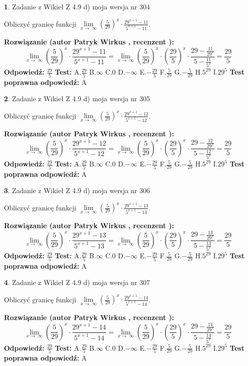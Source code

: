 \documentclass[12pt, a4paper]{article}
\theoremstyle{definition} %
\newtheorem{zad}{}
\newcommand{\zadStart}[1]{\begin{zad}#1\newline}
\newcommand{\zadStop}{\end{zad}}
\newcommand{\rozwStart}[2]{\noindent \textbf{Rozwiązanie (autor #1 , recenzent #2): }\newline}
\newcommand{\rozwStop}{\newline}
\newcommand{\odpStart}{\noindent \textbf{Odpowiedź:}\newline}
\newcommand{\odpStop}{\newline}
\newcommand{\testStart}{\noindent \textbf{Test:}\newline}
\newcommand{\testStop}{\newline}
\newcommand{\kluczStart}{\noindent \textbf{Test poprawna odpowiedź:}\newline}
\newcommand{\kluczStop}{\newline}
\begin{document}
\zadStart{Zadanie z Wikieł Z 4.9 d) moja wersja nr 304}


Obliczyć granicę funkcji  $\lim\limits_{x\to\ \infty}(\frac{5}{29})^{x}\cdot\frac{29^{x+1}-11}{5^{x+1}-11}$.
\zadStop
\rozwStart{Patryk Wirkus}{}
$$\lim\limits_{x\to\ \infty}(\frac{5}{29})^{x}\cdot\frac{29^{x+1}-11}{5^{x+1}-11}=\lim\limits_{x\to\ \infty}(\frac{5}{29})^{x}\cdot(\frac{29}{5})^{x} \cdot \frac{29-\frac{11}{29^{x}}}{5-\frac{11}{5^{x}}} = \frac{29}{5}$$
\rozwStop
\odpStart
$\frac{29}{5}$
\odpStop
\testStart
A.$\frac{29}{5}$ B.$\infty$ C.$0$ D.$-\infty$ E.$-\frac{29}{5}$
F.$\frac{5}{29}$ G.$-\frac{5}{29}$
H.$5^{29}$
I.$29^{5}$
\testStop
\kluczStart
A
\kluczStop



\zadStart{Zadanie z Wikieł Z 4.9 d) moja wersja nr 305}


Obliczyć granicę funkcji  $\lim\limits_{x\to\ \infty}(\frac{5}{29})^{x}\cdot\frac{29^{x+1}-12}{5^{x+1}-12}$.
\zadStop
\rozwStart{Patryk Wirkus}{}
$$\lim\limits_{x\to\ \infty}(\frac{5}{29})^{x}\cdot\frac{29^{x+1}-12}{5^{x+1}-12}=\lim\limits_{x\to\ \infty}(\frac{5}{29})^{x}\cdot(\frac{29}{5})^{x} \cdot \frac{29-\frac{12}{29^{x}}}{5-\frac{12}{5^{x}}} = \frac{29}{5}$$
\rozwStop
\odpStart
$\frac{29}{5}$
\odpStop
\testStart
A.$\frac{29}{5}$ B.$\infty$ C.$0$ D.$-\infty$ E.$-\frac{29}{5}$
F.$\frac{5}{29}$ G.$-\frac{5}{29}$
H.$5^{29}$
I.$29^{5}$
\testStop
\kluczStart
A
\kluczStop



\zadStart{Zadanie z Wikieł Z 4.9 d) moja wersja nr 306}


Obliczyć granicę funkcji  $\lim\limits_{x\to\ \infty}(\frac{5}{29})^{x}\cdot\frac{29^{x+1}-13}{5^{x+1}-13}$.
\zadStop
\rozwStart{Patryk Wirkus}{}
$$\lim\limits_{x\to\ \infty}(\frac{5}{29})^{x}\cdot\frac{29^{x+1}-13}{5^{x+1}-13}=\lim\limits_{x\to\ \infty}(\frac{5}{29})^{x}\cdot(\frac{29}{5})^{x} \cdot \frac{29-\frac{13}{29^{x}}}{5-\frac{13}{5^{x}}} = \frac{29}{5}$$
\rozwStop
\odpStart
$\frac{29}{5}$
\odpStop
\testStart
A.$\frac{29}{5}$ B.$\infty$ C.$0$ D.$-\infty$ E.$-\frac{29}{5}$
F.$\frac{5}{29}$ G.$-\frac{5}{29}$
H.$5^{29}$
I.$29^{5}$
\testStop
\kluczStart
A
\kluczStop



\zadStart{Zadanie z Wikieł Z 4.9 d) moja wersja nr 307}


Obliczyć granicę funkcji  $\lim\limits_{x\to\ \infty}(\frac{5}{29})^{x}\cdot\frac{29^{x+1}-14}{5^{x+1}-14}$.
\zadStop
\rozwStart{Patryk Wirkus}{}
$$\lim\limits_{x\to\ \infty}(\frac{5}{29})^{x}\cdot\frac{29^{x+1}-14}{5^{x+1}-14}=\lim\limits_{x\to\ \infty}(\frac{5}{29})^{x}\cdot(\frac{29}{5})^{x} \cdot \frac{29-\frac{14}{29^{x}}}{5-\frac{14}{5^{x}}} = \frac{29}{5}$$
\rozwStop
\odpStart
$\frac{29}{5}$
\odpStop
\testStart
A.$\frac{29}{5}$ B.$\infty$ C.$0$ D.$-\infty$ E.$-\frac{29}{5}$
F.$\frac{5}{29}$ G.$-\frac{5}{29}$
H.$5^{29}$
I.$29^{5}$
\testStop
\kluczStart
A
\kluczStop
\end{document}
